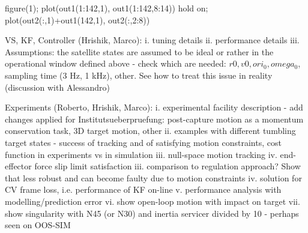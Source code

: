 	figure(1); plot(out1(1:142,1), out1(1:142,8:14))
	hold on; plot(out2(:,1)+out1(142,1), out2(:,2:8))


VS, KF, Controller (Hrishik, Marco):
	i. tuning details
	ii. performance details
	iii. Assumptions: the satellite states are assumed to be ideal or rather in the operational window defined above - check which are needed: $r0, v0, ori_0, omega_0$, sampling time (3 Hz, 1 kHz), other. See how to treat this issue in reality (discussion with Alessandro)


Experiments (Roberto, Hrishik, Marco):
	i. experimental facility description - add changes applied for Institutsueberpruefung: post-capture motion as a momentum conservation task, 3D target motion, other
	ii. examples with different tumbling target states - success of tracking and of satisfying motion constraints, cost function in experiments vs in simulation
	iii. null-space motion tracking
	iv. end-effector force slip limit satisfaction
	iii. comparison to regulation approach? Show that less robust and can become faulty due to motion constraints
	iv. solution for CV frame loss, i.e. performance of KF on-line
	v. performance analysis with modelling/prediction error
	vi. show open-loop motion with impact on target
	vii. show singularity with N45 (or N30) and inertia servicer divided by 10 - perhaps seen on OOS-SIM

